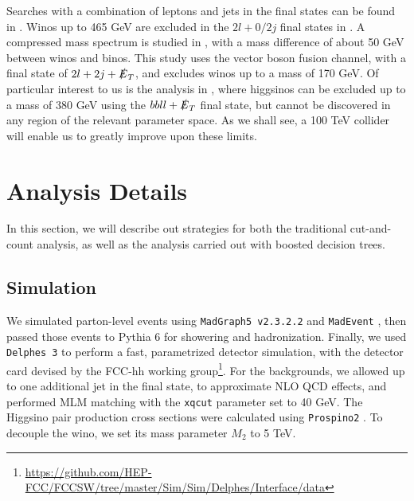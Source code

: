 Searches with a combination of leptons and jets in the final states can be found in \citep{Aad:2014vma,Khachatryan:2015kxa,Khachatryan:2014mma}. Winos up to 465 GeV are excluded in the $2l + 0/2j$ final states in \citep{Aad:2014vma}. A compressed mass spectrum is studied in \citep{Khachatryan:2015kxa}, with a mass difference of about 50 GeV between winos and binos. This study uses the vector boson fusion channel, with a final state of $2l + 2j + \slashed{E}_T$, and excludes winos up to a mass of 170 GeV. Of particular interest to us is the analysis in \citep{Khachatryan:2014mma}, where higgsinos can be excluded up to a mass of 380 GeV using the $bbll + \slashed{E}_T$ final state, but cannot be discovered in any region of the relevant parameter space. As we shall see, a 100 TeV collider will enable us to greatly improve upon these limits.

\section{Analysis Details}\label{sec:analysis}

In this section, we will describe out strategies for both the traditional cut-and-count analysis, as well as the analysis carried out with boosted decision trees. 

\subsection{Simulation}\label{simulation}

We simulated parton-level events using \texttt{MadGraph5 v2.3.2.2} and \texttt{MadEvent} \citep{Alwall2014}, then passed those events to Pythia 6 \citep{Sjostrand2006} for showering and hadronization. Finally, we used \texttt{Delphes 3} \citep{DeFavereau2014a} to perform a fast, parametrized detector simulation, with the detector card devised by the FCC-hh working group\footnote{\url{https://github.com/HEP-FCC/FCCSW/tree/master/Sim/Sim/Delphes/Interface/data}}. For the backgrounds, we allowed up to one additional jet in the final state, to approximate NLO QCD effects, and performed MLM matching with the \texttt{xqcut} parameter set to 40 GeV. The Higgsino pair production cross sections were calculated using \texttt{Prospino2} \citep{Beenakker1999}. To decouple the wino, we set its mass parameter $M_2$ to 5 TeV.


